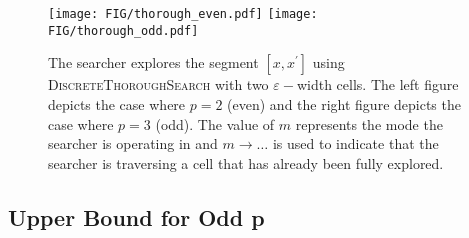 \begin{figure}[!htb]
    \begin{center}
      \texttt{[image: FIG/thorough\_even.pdf]}
      \hspace{1cm}
      \texttt{[image: FIG/thorough\_odd.pdf]}
    \end{center}
    \caption{The searcher explores the segment $[x,x^\prime]$ using \textsc{DiscreteThoroughSearch} with two $\varepsilon-$width cells. The left figure depicts the case where $p=2$ (even) and the right figure depicts the case where $p=3$ (odd). The value of $m$ represents the mode the searcher is operating in and $m \rightarrow \ldots$ is used to indicate that the searcher is traversing a cell that has already been fully explored.}
\end{figure}





\subsection{Upper Bound for Odd p}

